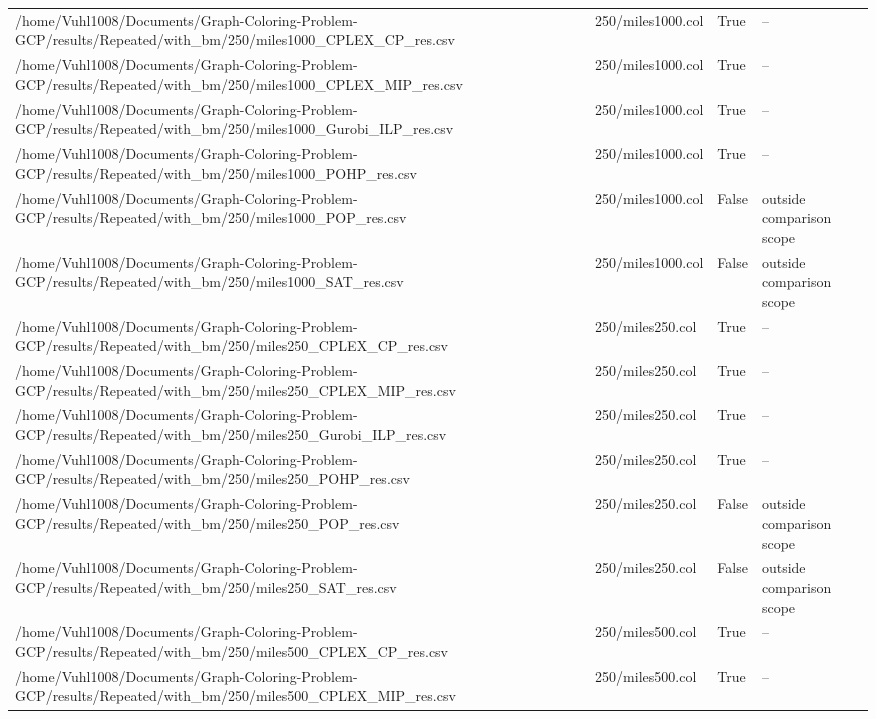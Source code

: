 \begin{table}[htbp]
\begin{tabular}{llll}
/home/Vuhl1008/Documents/Graph-Coloring-Problem-GCP/results/Repeated/with\_bm/250/miles1000\_CPLEX\_CP\_res.csv & 250/miles1000.col & True & -- \\
/home/Vuhl1008/Documents/Graph-Coloring-Problem-GCP/results/Repeated/with\_bm/250/miles1000\_CPLEX\_MIP\_res.csv & 250/miles1000.col & True & -- \\
/home/Vuhl1008/Documents/Graph-Coloring-Problem-GCP/results/Repeated/with\_bm/250/miles1000\_Gurobi\_ILP\_res.csv & 250/miles1000.col & True & -- \\
/home/Vuhl1008/Documents/Graph-Coloring-Problem-GCP/results/Repeated/with\_bm/250/miles1000\_POHP\_res.csv & 250/miles1000.col & True & -- \\
/home/Vuhl1008/Documents/Graph-Coloring-Problem-GCP/results/Repeated/with\_bm/250/miles1000\_POP\_res.csv & 250/miles1000.col & False & outside comparison scope \\
/home/Vuhl1008/Documents/Graph-Coloring-Problem-GCP/results/Repeated/with\_bm/250/miles1000\_SAT\_res.csv & 250/miles1000.col & False & outside comparison scope \\
/home/Vuhl1008/Documents/Graph-Coloring-Problem-GCP/results/Repeated/with\_bm/250/miles250\_CPLEX\_CP\_res.csv & 250/miles250.col & True & -- \\
/home/Vuhl1008/Documents/Graph-Coloring-Problem-GCP/results/Repeated/with\_bm/250/miles250\_CPLEX\_MIP\_res.csv & 250/miles250.col & True & -- \\
/home/Vuhl1008/Documents/Graph-Coloring-Problem-GCP/results/Repeated/with\_bm/250/miles250\_Gurobi\_ILP\_res.csv & 250/miles250.col & True & -- \\
/home/Vuhl1008/Documents/Graph-Coloring-Problem-GCP/results/Repeated/with\_bm/250/miles250\_POHP\_res.csv & 250/miles250.col & True & -- \\
/home/Vuhl1008/Documents/Graph-Coloring-Problem-GCP/results/Repeated/with\_bm/250/miles250\_POP\_res.csv & 250/miles250.col & False & outside comparison scope \\
/home/Vuhl1008/Documents/Graph-Coloring-Problem-GCP/results/Repeated/with\_bm/250/miles250\_SAT\_res.csv & 250/miles250.col & False & outside comparison scope \\
/home/Vuhl1008/Documents/Graph-Coloring-Problem-GCP/results/Repeated/with\_bm/250/miles500\_CPLEX\_CP\_res.csv & 250/miles500.col & True & -- \\
/home/Vuhl1008/Documents/Graph-Coloring-Problem-GCP/results/Repeated/with\_bm/250/miles500\_CPLEX\_MIP\_res.csv & 250/miles500.col & True & -- \\

\end{tabular}
\end{table}
